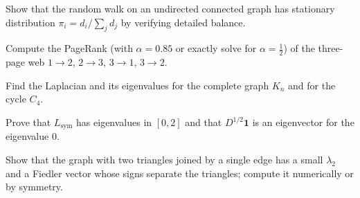 \begin{exercise}
Show that the random walk on an undirected connected graph has stationary distribution $\pi_i=d_i/\sum_jd_j$ by verifying detailed balance.
\end{exercise}

\begin{exercise}
Compute the PageRank (with $\alpha=0.85$ or exactly solve for $\alpha=\tfrac12$) of the three-page web $1\to2$, $2\to3$, $3\to1$, $3\to2$.
\end{exercise}

\begin{exercise}
Find the Laplacian and its eigenvalues for the complete graph $K_n$ and for the cycle $C_4$.
\end{exercise}

\begin{exercise}
Prove that $L_{\mathrm{sym}}$ has eigenvalues in $[0,2]$ and that $D^{1/2}\mathbf{1}$ is an eigenvector for the eigenvalue $0$.
\end{exercise}

\begin{exercise}
Show that the graph with two triangles joined by a single edge has a small $\lambda_2$ and a Fiedler vector whose signs separate the triangles; compute it numerically or by symmetry.
\end{exercise}
